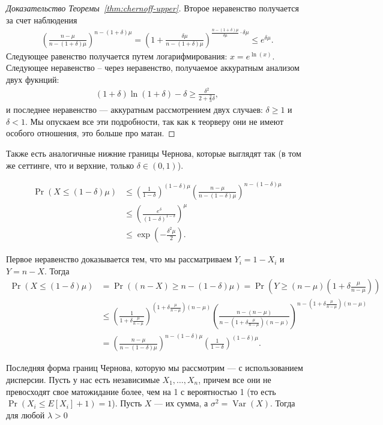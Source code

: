 \documentclass[12pt]{article}
\DeclareMathOperator{\Var}{Var}
\begin{document}
\begin{proof}[Доказательство Теоремы~\ref{thm:chernoff-upper}]
 Второе неравенство получается за счет наблюдения
 \begin{align*}
  \left(\frac{n - \mu}{n - (1 + \delta)\mu}\right)^{n - (1 + \delta)\mu} = \left(1 + \frac{\delta\mu}{n - (1 + \delta)\mu}\right)^{\frac{n - (1 + \delta)\mu}{\delta\mu} \cdot \delta \mu} \le e^{\delta\mu}.
 \end{align*}
  Следующее равенство получается путем логарифмирования: $x = e^{\ln(x)}$. Следующее неравенство -- через неравенство, получаемое аккуратным анализом двух фукнций:
  \begin{align*}
    (1 + \delta)\ln(1 + \delta) - \delta \ge \frac{\delta^2}{2 + \frac{2}{3}\delta},
  \end{align*}
  и последнее неравенство --- аккуратным рассмотрением двух случаев: $\delta \ge 1$ и $\delta < 1$. Мы опускаем все эти подробности, так как к теорверу они не имеют особого отношения, это больше про матан.
\end{proof}

Также есть аналогичные нижние границы Чернова, которые выглядят так (в том же сеттинге, что и верхние, только $\delta \in (0, 1)$).

\begin{align*}
  \Pr(X \le (1 - \delta)\mu) &\le \left(\frac{1}{1 - \delta}\right)^{(1 - \delta)\mu} \left(\frac{n - \mu}{n - (1 - \delta)\mu}\right)^{n - (1 - \delta)\mu} \\
  &\le \left(\frac{e^\delta}{(1 - \delta)^{1 - \delta}}\right)^{\mu} \\
  &\le \exp\left(-\frac{\delta^2\mu}{2}\right).
\end{align*}

Первое неравенство доказывается тем, что мы рассматриваем $Y_i = 1 - X_i$ и $Y = n - X$. Тогда
\begin{align*}
  \Pr(X \le (1 - \delta)\mu) &= \Pr((n - X) \ge n - (1 - \delta)\mu)  = \Pr\left(Y \ge (n - \mu)\left(1 + \delta \frac{\mu}{n - \mu}\right) \right) \\
  &\le \left(\frac{1}{1 + \delta \frac{\mu}{n - \mu}}\right)^{(1 + \delta \frac{\mu}{n - \mu})(n - \mu)} \left(\frac{n - (n - \mu)}{n - \left(1 + \delta \frac{\mu}{n - \mu}\right)(n - \mu)}\right)^{n - (1 + \delta \frac{\mu}{n - \mu})(n - \mu)} \\
  &= \left(\frac{n - \mu}{n - (1 - \delta)\mu}\right)^{n - (1 - \delta)\mu} \left(\frac{1}{1 - \delta}\right)^{(1 - \delta)\mu}.
\end{align*}

Последняя форма границ Чернова, которую мы рассмотрим --- с использованием дисперсии. Пусть у нас есть независимые $X_1, \dots, X_n$, причем все они не превосходят свое матожидание более, чем на 1 с вероятностью 1 (то есть $\Pr(X_i \le E[X_i] + 1) = 1$). Пусть $X$ --- их сумма, а $\sigma^2 = \Var(X)$. Тогда для любой $\lambda > 0$
\end{document}
